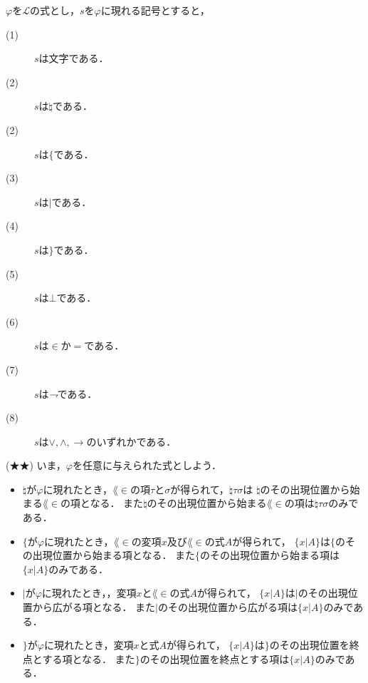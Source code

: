 	$\varphi$を$\mathcal{L}$の式とし，$s$を$\varphi$に現れる記号とすると，
	\begin{description}
		\item[(1)] $s$は文字である．
		\item[(2)] $s$は$\natural$である．
		\item[(2)] $s$は$\{$である．
		\item[(3)] $s$は$|$である．
		\item[(4)] $s$は$\}$である．
		\item[(5)] $s$は$\bot$である．
		\item[(6)] $s$は$\in$か$=$である．
		\item[(7)] $s$は$\rightharpoondown\hspace{-0.25em}$である．
		\item[(8)] $s$は$\vee,\wedge,\rightarrow$のいずれかである．
	\end{description}
	
	\begin{screen}
		(★★) いま，$\varphi$を任意に与えられた式としよう．
		\begin{itemize}
			\item $\natural$が$\varphi$に現れたとき，$\lang{\in}$の項$\tau$と$\sigma$が得られて，$\natural \tau \sigma$は
				$\natural$のその出現位置から始まる$\lang{\in}$の項となる．
				また$\natural$のその出現位置から始まる$\lang{\in}$の項は$\natural \tau \sigma$のみである．
				
			\item $\{$が$\varphi$に現れたとき，$\lang{\in}$の変項$x$及び$\lang{\in}$の式$A$が得られて，
				$\{ x|A\}$は$\{$のその出現位置から始まる項となる．
				また$\{$のその出現位置から始まる項は$\{x|A\}$のみである．
				
			\item $|$が$\varphi$に現れたとき，，変項$x$と$\lang{\in}$の式$A$が得られて，
				$\{x|A\}$は$|$のその出現位置から広がる項となる．
				また$|$のその出現位置から広がる項は$\{x|A\}$のみである．
				
			\item $\}$が$\varphi$に現れたとき，変項$x$と式$A$が得られて，
				$\{x|A\}$は$\}$のその出現位置を終点とする項となる．
				また$\}$のその出現位置を終点とする項は$\{x|A\}$のみである．
		\end{itemize}
	\end{screen}
	

